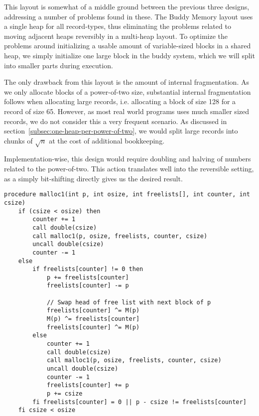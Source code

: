 This layout is somewhat of a middle ground between the previous three designs, addressing a number of problems found in these. The Buddy Memory layout uses a single heap for all record-types, thus eliminating the problems related to moving adjacent heaps reversibly in a multi-heap layout. To optimize the problems around initializing a usable amount of variable-sized blocks in a shared heap, we simply initialize one large block in the buddy system, which we will split into smaller parts during execution.

The only drawback from this layout is the amount of internal fragmentation. As we only allocate blocks of a power-of-two size, substantial internal fragmentation follows when allocating large records, i.e. allocating a block of size 128 for a record of size 65. However, as most real world programs uses much smaller sized records, we do not consider this a very frequent scenario. As discussed in section~\ref{subsec:one-heap-per-power-of-two}, we would split large records into chunks of $\sqrt{n}$ at the cost of additional bookkeeping.

Implementation-wise, this design would require doubling and halving of numbers related to the power-of-two. This action translates well into the reversible setting, as a simply bit-shifting directly gives us the desired result.\\

\begin{lstlisting}[caption={The Buddy Memory algorithm implemented in extended Janus}, language=janus, style=basic, label={lst:buddy-memory}]
  procedure malloc1(int p, int osize, int freelists[], int counter, int csize)
    if (csize < osize) then
        counter += 1
        call double(csize)
        call malloc1(p, osize, freelists, counter, csize) 
        uncall double(csize)
        counter -= 1
    else
        if freelists[counter] != 0 then
            p += freelists[counter]
            freelists[counter] -= p

            // Swap head of free list with next block of p
            freelists[counter] ^= M(p)
            M(p) ^= freelists[counter]
            freelists[counter] ^= M(p)
        else
            counter += 1
            call double(csize)
            call malloc1(p, osize, freelists, counter, csize)
            uncall double(csize)
            counter -= 1
            freelists[counter] += p
            p += csize
        fi freelists[counter] = 0 || p - csize != freelists[counter]
    fi csize < osize   
\end{lstlisting}

